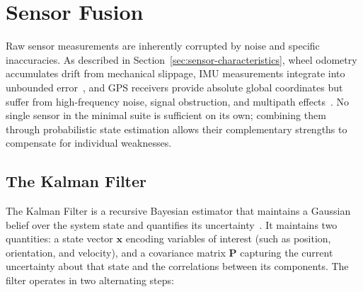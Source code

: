 \section{Sensor Fusion}
\label{sec:sensor-fusion}

Raw sensor measurements are inherently corrupted by noise and specific inaccuracies. As described in Section~\ref{sec:sensor-characteristics}, wheel odometry accumulates drift from mechanical slippage, IMU measurements integrate into unbounded error~\cite{woodman2007inertial,moore2015ekf}, and GPS receivers provide absolute global coordinates but suffer from high-frequency noise, signal obstruction, and multipath effects~\cite{schmidt2025vislam}. No single sensor in the minimal suite is sufficient on its own; combining them through probabilistic state estimation allows their complementary strengths to compensate for individual weaknesses.

\subsection{The Kalman Filter}
\label{subsec:kalman-filter}

The Kalman Filter is a recursive Bayesian estimator that maintains a Gaussian belief over the system state and quantifies its uncertainty~\cite{moore2015ekf,thrun2005probabilistic}. It maintains two quantities: a state vector $\mathbf{x}$ encoding variables of interest (such as position, orientation, and velocity), and a covariance matrix $\mathbf{P}$ capturing the current uncertainty about that state and the correlations between its components. The filter operates in two alternating steps:

